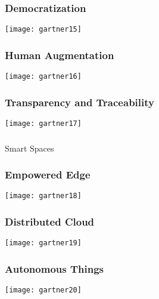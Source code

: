 \begin{frame}[fragile]\frametitle{Democratization}
\begin{center}
\texttt{[image: gartner15]}
\end{center}
\end{frame}


\begin{frame}[fragile]\frametitle{Human Augmentation}
\begin{center}
\texttt{[image: gartner16]}
\end{center}
\end{frame}

\begin{frame}[fragile]\frametitle{Transparency and Traceability}
\begin{center}
\texttt{[image: gartner17]}
\end{center}
\end{frame}

\begin{frame}[fragile]\frametitle{}
\begin{center}
{\Large Smart Spaces}
\end{center}
\end{frame}

\begin{frame}[fragile]\frametitle{Empowered Edge}
\begin{center}
\texttt{[image: gartner18]}
\end{center}
\end{frame}

\begin{frame}[fragile]\frametitle{Distributed Cloud}
\begin{center}
\texttt{[image: gartner19]}
\end{center}
\end{frame}

\begin{frame}[fragile]\frametitle{Autonomous Things}
\begin{center}
\texttt{[image: gartner20]}
\end{center}
\end{frame}

